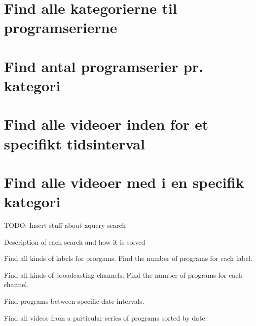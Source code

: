 
\section{Find alle kategorierne til programserierne}

\section{Find antal programserier pr. kategori}

\section{Find alle videoer inden for et specifikt tidsinterval}

\section{Find alle videoer med i en specifik kategori}


TODO: Insert stuff about xquery search

Description of each search and how it is solved

Find all kinds of labels for prorgams.
Find the number of programs for each label.

Find all kinds of broadcasting channels.
Find the number of programs for each channel.

Find programs between specific date intervals.

Find all videos from a particular series of programs sorted by date.

